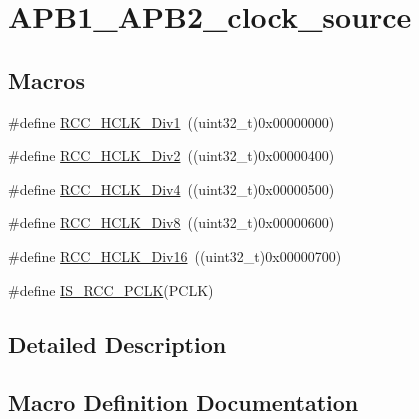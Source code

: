 \hypertarget{group___a_p_b1___a_p_b2__clock__source}{}\section{A\+P\+B1\+\_\+\+A\+P\+B2\+\_\+clock\+\_\+source}
\label{group___a_p_b1___a_p_b2__clock__source}
\subsection*{Macros}
\begin{DoxyCompactItemize}
\item 
\#define \mbox{\hyperlink{group___a_p_b1___a_p_b2__clock__source_gae62b4a39ae69cc221f2ab7d4518bfb76}{R\+C\+C\+\_\+\+H\+C\+L\+K\+\_\+\+Div1}}~((uint32\+\_\+t)0x00000000)
\item 
\#define \mbox{\hyperlink{group___a_p_b1___a_p_b2__clock__source_ga177bb3648def9a961c16f93f15ca0f62}{R\+C\+C\+\_\+\+H\+C\+L\+K\+\_\+\+Div2}}~((uint32\+\_\+t)0x00000400)
\item 
\#define \mbox{\hyperlink{group___a_p_b1___a_p_b2__clock__source_gafd8cf0e32a3ea5648cdc054766bc2017}{R\+C\+C\+\_\+\+H\+C\+L\+K\+\_\+\+Div4}}~((uint32\+\_\+t)0x00000500)
\item 
\#define \mbox{\hyperlink{group___a_p_b1___a_p_b2__clock__source_gab2e2b6e0b8fe22d6638b672918b22097}{R\+C\+C\+\_\+\+H\+C\+L\+K\+\_\+\+Div8}}~((uint32\+\_\+t)0x00000600)
\item 
\#define \mbox{\hyperlink{group___a_p_b1___a_p_b2__clock__source_ga6353aaa0b302fdd5d946fd21756e2273}{R\+C\+C\+\_\+\+H\+C\+L\+K\+\_\+\+Div16}}~((uint32\+\_\+t)0x00000700)
\item 
\#define \mbox{\hyperlink{group___a_p_b1___a_p_b2__clock__source_gab70f1257ea47c1da4def8e351af4d9f2}{I\+S\+\_\+\+R\+C\+C\+\_\+\+P\+C\+LK}}(P\+C\+LK)
\end{DoxyCompactItemize}


\subsection{Detailed Description}


\subsection{Macro Definition Documentation}
\mbox{\label{group___a_p_b1___a_p_b2__clock__source_gab70f1257ea47c1da4def8e351af4d9f2}} 
